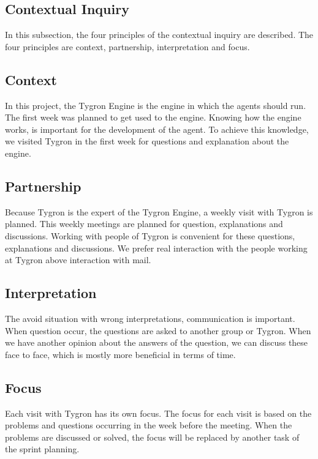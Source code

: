 \newpage

\subsection{Contextual Inquiry}
In this subsection, the four principles of the contextual inquiry are described. The four principles are context, partnership, interpretation and focus.

\subsection{Context}
In this project, the Tygron Engine is the engine in which the agents should run. The first week was planned to get used to the engine. Knowing how the engine works, is important for the development of the agent. To achieve this knowledge, we visited Tygron in the first week for questions and explanation about the engine.  

\subsection{Partnership}
Because Tygron is the expert of the Tygron Engine, a weekly visit with Tygron is planned. This weekly meetings are planned for question, explanations and discussions. Working with people of Tygron is convenient for these questions, explanations and discussions. We prefer real interaction with the people working at Tygron above interaction with mail.

\subsection{Interpretation}
The avoid situation with wrong interpretations, communication is important. When question occur, the questions are asked to another group or Tygron. When we have another opinion about the answers of the question, we can discuss these face to face, which is mostly more beneficial in terms of time. 

\subsection{Focus}
Each visit with Tygron has its own focus. The focus for each visit is based on the problems and questions occurring in the week before the meeting. When the problems are discussed or solved, the focus will be replaced by another task of the sprint planning. 

\newpage

